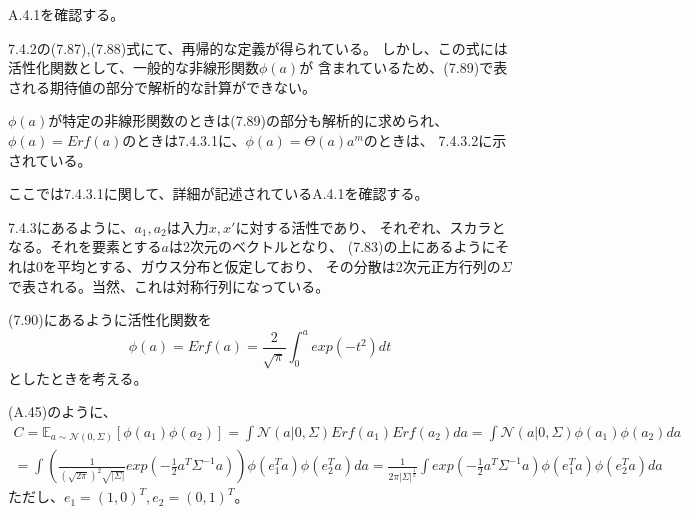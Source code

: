 \documentclass{jsarticle}
\begin{document}
A.4.1を確認する。

7.4.2の(7.87),(7.88)式にて、再帰的な定義が得られている。
しかし、この式には活性化関数として、一般的な非線形関数$\phi(a)$が
含まれているため、(7.89)で表される期待値の部分で解析的な計算ができない。

$\phi(a)$が特定の非線形関数のときは(7.89)の部分も解析的に求められ、
$\phi(a) = Erf(a)$のときは7.4.3.1に、$\phi(a) = \Theta(a)a^m$のときは、
7.4.3.2に示されている。

ここでは7.4.3.1に関して、詳細が記述されているA.4.1を確認する。

7.4.3にあるように、$a_1, a_2$は入力$x, x'$に対する活性であり、
それぞれ、スカラとなる。それを要素とする$a$は2次元のベクトルとなり、
(7.83)の上にあるようにそれは0を平均とする、ガウス分布と仮定しており、
その分散は2次元正方行列の$\Sigma$で表される。当然、これは対称行列になっている。

(7.90)にあるように活性化関数を
\begin{equation}
\phi(a) = Erf(a) = \frac{2}{\sqrt{\pi}} \int_0^a exp(-t^2)dt
\end{equation}
としたときを考える。

(A.45)のように、
\begin{equation}
\begin{split}
C = \mathbb{E}_{a \sim \mathcal{N}(0, \Sigma)}[\phi(a_1)\phi(a_2)] 
= \int \mathcal{N}(a | 0, \Sigma)Erf(a_1)Erf(a_2)da
= \int \mathcal{N}(a | 0, \Sigma)\phi(a_1)\phi(a_2)da\\
= \int (\frac{1}{(\sqrt{2\pi})^{2}\sqrt{|\Sigma|}} exp(-\frac{1}{2}a^T \Sigma^{-1} a)) \phi(e_1^T a)\phi(e_2^T a)da
= \frac{1}{2\pi |\Sigma|^{\frac{1}{2}}} \int exp(-\frac{1}{2}a^T \Sigma^{-1} a) \phi(e_1^T a)\phi(e_2^T a)da
\end{split}
\end{equation}
ただし、$e_1 = (1, 0)^T, e_2 = (0, 1)^T$。
\end{document}

